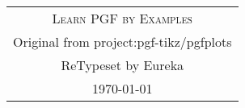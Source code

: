 \documentclass{article}
\begin{document}
\begin{titlepage}
  \vspace*{\fill}\begin{center} 
    \begin{tabular}{c}
      \textsc{\Huge Learn PGF by Examples} \\[5em]
      Original from project:pgf-tikz/pgfplots \\[2em]
      ReTypeset by Eureka \\[2em]
      \today
    \end{tabular}
  \end{center}\vspace*{\fill}
\end{titlepage}

\end{document}
